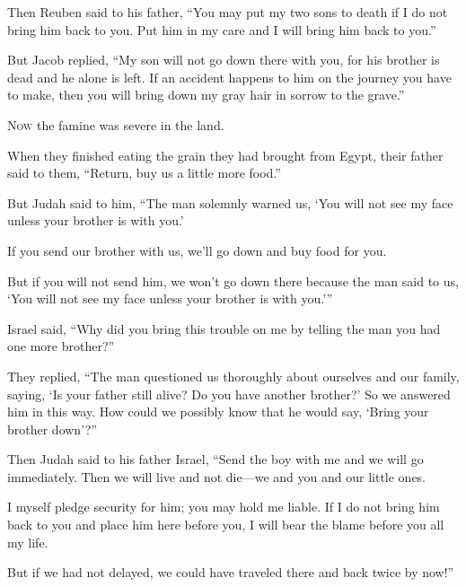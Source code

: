 \begin{scripture}
 Then Reuben said to his father, ``You may put my two sons to death if I do not bring him back to you. Put him in my care and I will bring him back to you.''
 But Jacob replied, ``My son will not go down there with you, for his brother is dead and he alone is left. If an accident happens to him on the journey you have to make, then you will bring down my gray hair in sorrow to the grave.''

 \allowchapbreak\hypertarget{ch-genesis-43}{}\lettrine[lines=5]{\color{pentateuch}N}{\textsc{ow}} the famine was severe in the land.\everypar{}
 When they finished eating the grain they had brought from Egypt, their father said to them, ``Return, buy us a little more food.''
\\\indent{} But Judah said to him, ``The man solemnly warned us, `You will not see my face unless your brother is with you.'
 If you send our brother with us, we'll go down and buy food for you.
 But if you will not send him, we won't go down there because the man said to us, `You will not see my face unless your brother is with you.'''
\everypar{}

 Israel said, ``Why did you bring this trouble on me by telling the man you had one more brother?''
\everypar{}

 They replied, ``The man questioned us thoroughly about ourselves and our family, saying, `Is your father still alive? Do you have another brother?' So we answered him in this way. How could we possibly know that he would say, `Bring your brother down'?''
\everypar{}

 Then Judah said to his father Israel, ``Send the boy with me and we will go immediately. Then we will live and not die---we and you and our little ones.
 I myself pledge security for him; you may hold me liable. If I do not bring him back to you and place him here before you, I will bear the blame before you all my life.
 But if we had not delayed, we could have traveled there and back twice by now!''
\everypar{}


\end{scripture}
